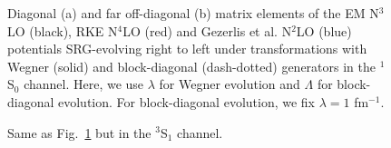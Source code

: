 \documentclass[preprintnumbers,floatfix,aps,prc,preprint,nofootinbib]{revtex4-1}
\begin{document}
\begin{figure}[H]
	\centering
	
	\caption{Diagonal (a) and far off-diagonal (b) matrix elements of the EM N$^3$LO (black), RKE N$^4$LO (red) and Gezerlis et al. N$^2$LO (blue) potentials SRG-evolving right to left under transformations with Wegner (solid) and block-diagonal (dash-dotted) generators in the $^1$S$_0$ channel. Here, we use $\lambda$ for Wegner evolution and $\Lambda$ for block-diagonal evolution. For block-diagonal evolution, we fix $\lambda=1$ fm$^{-1}$.}
	\label{fig:potential_slices_1S0}
\end{figure}
%
\begin{figure}[H]
	\centering
	
	\caption{Same as Fig.~\ref{fig:potential_slices_1S0} but in the $^3$S$_1$ channel.}
	\label{fig:potential_slices_3S1}
\end{figure}
\end{document}
